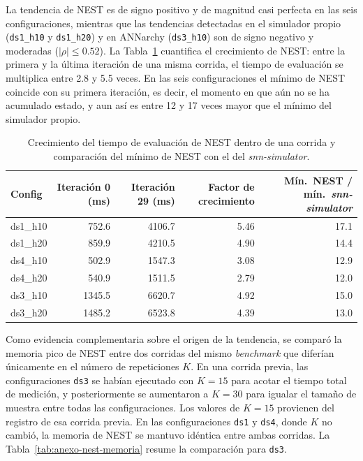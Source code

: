 La tendencia de NEST es de signo positivo y de magnitud casi perfecta en las seis configuraciones, mientras que las tendencias detectadas en el simulador propio (\texttt{ds1\_h10} y \texttt{ds1\_h20}) y en ANNarchy (\texttt{ds3\_h10}) son de signo negativo y moderadas ($|\rho|\leq 0.52$). La Tabla~\ref{tab:anexo-nest-crecimiento} cuantifica el crecimiento de NEST: entre la primera y la última iteración de una misma corrida, el tiempo de evaluación se multiplica entre 2.8 y 5.5 veces. En las seis configuraciones el mínimo de NEST coincide con su primera iteración, es decir, el momento en que aún no se ha acumulado estado, y aun así es entre 12 y 17 veces mayor que el mínimo del simulador propio.

\begin{table}[htbp]
\centering
\small
\caption{Crecimiento del tiempo de evaluación de NEST dentro de una corrida y comparación del mínimo de NEST con el del \textit{snn-simulator}.}
\label{tab:anexo-nest-crecimiento}
\begin{tabular}{lrrrr}
\toprule
Config & Iteración 0 (ms) & Iteración 29 (ms) & Factor de crecimiento & Mín.\ NEST / mín.\ \textit{snn-simulator} \\
\midrule
ds1\_h10 &  752.6 & 4106.7 & 5.46 & 17.1 \\
ds1\_h20 &  859.9 & 4210.5 & 4.90 & 14.4 \\
ds4\_h10 &  502.9 & 1547.3 & 3.08 & 12.9 \\
ds4\_h20 &  540.9 & 1511.5 & 2.79 & 12.0 \\
ds3\_h10 & 1345.5 & 6620.7 & 4.92 & 15.0 \\
ds3\_h20 & 1485.2 & 6523.8 & 4.39 & 13.0 \\
\bottomrule
\end{tabular}
\end{table}

Como evidencia complementaria sobre el origen de la tendencia, se comparó la memoria pico de NEST entre dos corridas del mismo \textit{benchmark} que diferían únicamente en el número de repeticiones $K$. En una corrida previa, las configuraciones \texttt{ds3} se habían ejecutado con $K=15$ para acotar el tiempo total de medición, y posteriormente se aumentaron a $K=30$ para igualar el tamaño de muestra entre todas las configuraciones. Los valores de $K=15$ provienen del registro de esa corrida previa. En las configuraciones \texttt{ds1} y \texttt{ds4}, donde $K$ no cambió, la memoria de NEST se mantuvo idéntica entre ambas corridas. La Tabla~\ref{tab:anexo-nest-memoria} resume la comparación para \texttt{ds3}.


